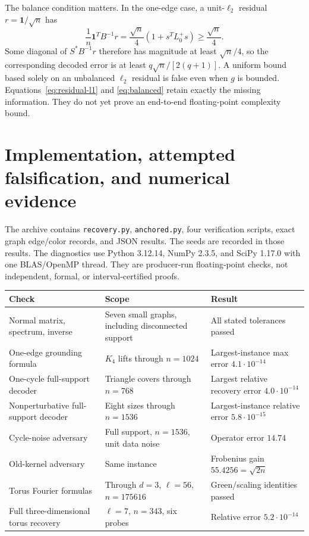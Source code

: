 \documentclass[11pt]{article}
\theoremstyle{remark}\newtheorem{remark}[theorem]{Remark}
\newcommand{\one}{\mathbf 1}
\begin{document}
The balance condition matters. In the one-edge case, a unit-$\ell_2$ residual $r=\one/\sqrt n$ has
\[
\frac1n\one^TB^{-1}r=\frac{\sqrt n}{4}(1+s^TL_0^+s)\geq\frac{\sqrt n}{4}.
\]
Some diagonal of $S^*B^{-1}r$ therefore has magnitude at least $\sqrt n/4$, so the corresponding decoded error is at least $q\sqrt n/[2(q+1)]$. A uniform bound based solely on an unbalanced $\ell_2$ residual is false even when $g$ is bounded. Equations~\eqref{eq:residual-l1} and \eqref{eq:balanced} retain exactly the missing information. They do not yet prove an end-to-end floating-point complexity bound.

\section{Implementation, attempted falsification, and numerical evidence}

The archive contains \texttt{recovery.py}, \texttt{anchored.py}, four verification scripts, exact graph edge/color records, and JSON results. The seeds are recorded in those results. The diagnostics use Python 3.12.14, NumPy 2.3.5, and SciPy 1.17.0 with one BLAS/OpenMP thread. They are producer-run floating-point checks, not independent, formal, or interval-certified proofs.

\begin{center}\small
\begin{tabular}{p{}p{}p{}}\toprule
Check & Scope & Result\\\midrule
Normal matrix, spectrum, inverse & Seven small graphs, including disconnected support & All stated tolerances passed\\
One-edge grounding formula & $K_4$ lifts through $n=1024$ & Largest-instance max error $4.1\cdot10^{-14}$\\
One-cycle full-support decoder & Triangle covers through $n=768$ & Largest relative recovery error $4.0\cdot10^{-14}$\\
Nonperturbative full-support decoder & Eight sizes through $n=1536$ & Largest-instance relative error $5.8\cdot10^{-15}$\\
Cycle-noise adversary & Full support, $n=1536$, unit data noise & Operator error $14.74$\\
Old-kernel adversary & Same instance & Frobenius gain $55.4256=\sqrt{2n}$\\
Torus Fourier formulas & Through $d=3$, $\ell=56$, $n=175616$ & Green/scaling identities passed\\
Full three-dimensional torus recovery & $\ell=7$, $n=343$, six probes & Relative error $5.2\cdot10^{-14}$\\\bottomrule
\end{tabular}
\end{center}
\end{document}
